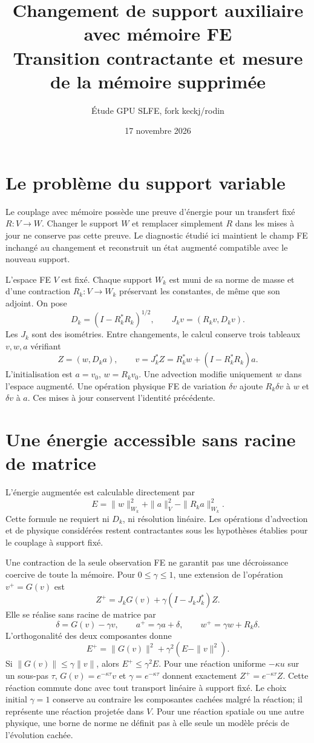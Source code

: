 \documentclass[11pt,a4paper]{article}
\title{Changement de support auxiliaire avec mémoire FE\\
Transition contractante et mesure de la mémoire supprimée}
\author{Étude GPU SLFE, fork keckj/rodin}
\date{17 novembre 2026}
\begin{document}
\maketitle

\section{Le problème du support variable}
Le couplage avec mémoire possède une preuve d'énergie pour un transfert
fixé $R:V\to W$. Changer le support $W$ et remplacer simplement $R$ dans
les mises à jour ne conserve pas cette preuve. Le diagnostic étudié
ici maintient le champ FE inchangé au changement et reconstruit un état
augmenté compatible avec le nouveau support.

L'espace FE $V$ est fixé. Chaque support $W_k$ est muni de sa norme de
masse et d'une contraction $R_k:V\to W_k$ préservant les constantes,
de même que son adjoint. On pose
\[
 D_k=(I-R_k^*R_k)^{1/2},\qquad J_k v=(R_kv,D_kv).
\]
Les $J_k$ sont des isométries. Entre changements, le calcul conserve
trois tableaux $v,w,a$ vérifiant
\[
 Z=(w,D_ka),\qquad v=J_k^*Z=R_k^*w+(I-R_k^*R_k)a.
\]
L'initialisation est $a=v_0$, $w=R_kv_0$. Une advection modifie uniquement
$w$ dans l'espace augmenté. Une opération physique FE de variation
$\delta v$ ajoute $R_k\delta v$ à $w$ et $\delta v$ à $a$.
Ces mises à jour conservent l'identité précédente.

\section{Une énergie accessible sans racine de matrice}
L'énergie augmentée est calculable directement par
\[
 E=\|w\|_{W_k}^2+\|a\|_V^2-\|R_ka\|_{W_k}^2.
\]
Cette formule ne requiert ni $D_k$, ni résolution linéaire. Les opérations
d'advection et de physique considérées restent contractantes sous les
hypothèses établies pour le couplage à support fixé.

Une contraction de la seule observation FE ne garantit pas une
décroissance coercive de toute la mémoire. Pour $0\leq\gamma\leq1$,
une extension de l'opération $v^+=G(v)$ est
\[
 Z^+=J_kG(v)+\gamma(I-J_kJ_k^*)Z.
\]
Elle se réalise sans racine de matrice par
\[
 \delta=G(v)-\gamma v,\qquad
 a^+=\gamma a+\delta,\qquad
 w^+=\gamma w+R_k\delta.
\]
L'orthogonalité des deux composantes donne
\[
 E^+=\|G(v)\|^2+\gamma^2(E-\|v\|^2).
\]
Si $\|G(v)\|\leq\gamma\|v\|$, alors $E^+\leq\gamma^2E$.
Pour une réaction uniforme $-\kappa u$ sur un sous-pas $\tau$,
$G(v)=e^{-\kappa\tau}v$ et $\gamma=e^{-\kappa\tau}$ donnent
exactement $Z^+=e^{-\kappa\tau}Z$. Cette réaction commute donc
avec tout transport linéaire à support fixé. Le choix initial
$\gamma=1$ conserve au contraire les composantes cachées malgré
la réaction; il représente une réaction projetée dans $V$.
Pour une réaction spatiale ou une autre physique, une borne de norme
ne définit pas à elle seule un modèle précis de l'évolution cachée.
\end{document}
